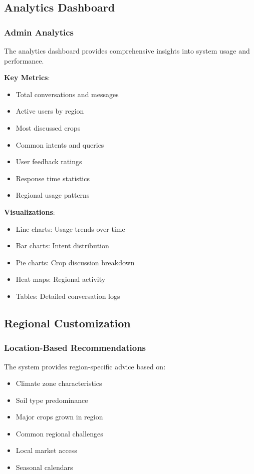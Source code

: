 \documentclass[12pt,a4paper]{article}
\begin{document}
\subsection{Analytics Dashboard}

\subsubsection{Admin Analytics}

The analytics dashboard provides comprehensive insights into system usage and performance.

\textbf{Key Metrics}:
\begin{itemize}[leftmargin=*]
    \item Total conversations and messages
    \item Active users by region
    \item Most discussed crops
    \item Common intents and queries
    \item User feedback ratings
    \item Response time statistics
    \item Regional usage patterns
\end{itemize}

\textbf{Visualizations}:
\begin{itemize}[leftmargin=*]
    \item Line charts: Usage trends over time
    \item Bar charts: Intent distribution
    \item Pie charts: Crop discussion breakdown
    \item Heat maps: Regional activity
    \item Tables: Detailed conversation logs
\end{itemize}

\subsection{Regional Customization}

\subsubsection{Location-Based Recommendations}

The system provides region-specific advice based on:

\begin{itemize}[leftmargin=*]
    \item Climate zone characteristics
    \item Soil type predominance
    \item Major crops grown in region
    \item Common regional challenges
    \item Local market access
    \item Seasonal calendars
\end{itemize}
\end{document}
